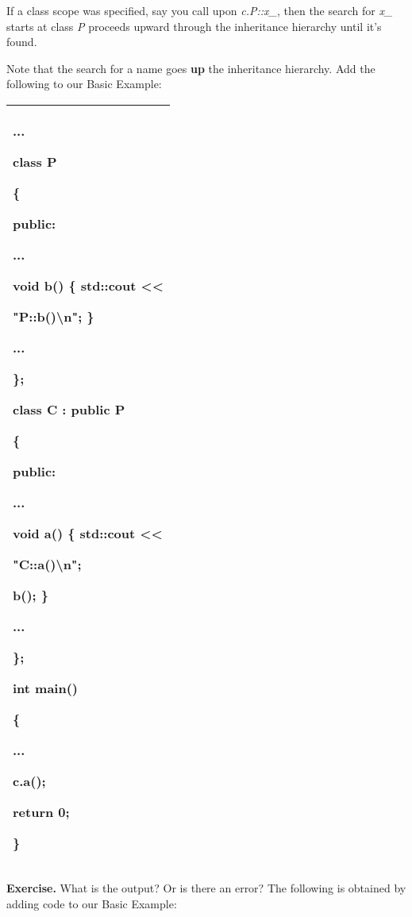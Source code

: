 \documentclass[
]{article}
\begin{document}
If a class scope was specified, say you call upon \emph{c.P::x\_}, then
the search for \emph{x\_} starts at class \emph{P} proceeds upward
through the inheritance hierarchy until it's found.

Note that the search for a name goes \textbf{up} the inheritance
hierarchy. Add the following to our Basic Example:

\begin{longtable}[]{@{}l@{}}
\toprule
\endhead
\begin{minipage}[t]{0.97\columnwidth}\raggedright
...

class P

\{

public:

...

\textbf{void b() \{ std::cout \textless\textless{} }

\textbf{ "P::b()\textbackslash n"; \}}

...

\};

class C : public P

\{

public:

...

\textbf{void a() \{ std::cout \textless\textless{} }

\textbf{ "C::a()\textbackslash n";}

\textbf{ b(); \} }

...

\};

int main()

\{

...

\textbf{c.a();}

return 0;

\}\strut
\end{minipage}\tabularnewline
\bottomrule
\end{longtable}

\textbf{Exercise.} What is the output? Or is there an error? The
following is obtained by adding code to our Basic Example:
\end{document}

